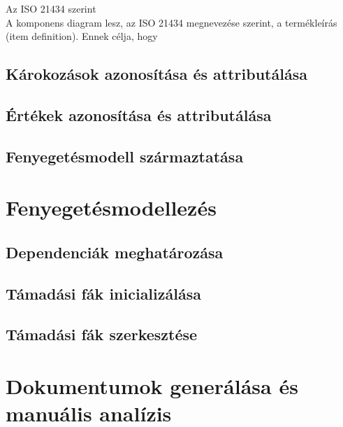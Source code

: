 Az ISO 21434 szerint\\

A komponens diagram lesz, az ISO 21434 megnevezése szerint, a termékleírás (item definition). Ennek célja, hogy 

\subsection{Károkozások azonosítása és attributálása}



\subsection{Értékek azonosítása és attributálása}

\subsection{Fenyegetésmodell származtatása}

\section{Fenyegetésmodellezés}

\subsection{Dependenciák meghatározása}

\subsection{Támadási fák inicializálása}

\subsection{Támadási fák szerkesztése}

\section{Dokumentumok generálása és manuális analízis}
